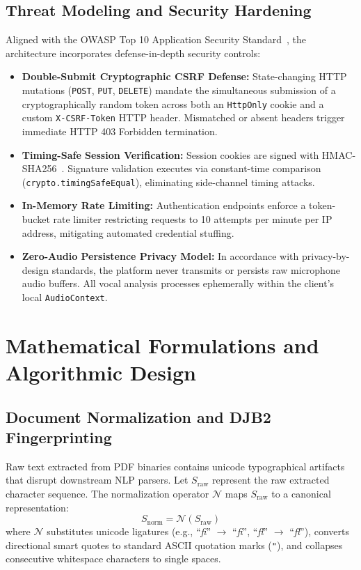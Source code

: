 \documentclass[conference]{IEEEtran}
\begin{document}
\subsection{Threat Modeling and Security Hardening}
Aligned with the OWASP Top 10 Application Security Standard~\cite{owasp2023top10}, the architecture incorporates defense-in-depth security controls:
\begin{itemize}
    \item \textbf{Double-Submit Cryptographic CSRF Defense:} State-changing HTTP mutations (\texttt{POST}, \texttt{PUT}, \texttt{DELETE}) mandate the simultaneous submission of a cryptographically random token across both an \texttt{HttpOnly} cookie and a custom \texttt{X-CSRF-Token} HTTP header. Mismatched or absent headers trigger immediate HTTP 403 Forbidden termination.
    \item \textbf{Timing-Safe Session Verification:} Session cookies are signed with HMAC-SHA256~\cite{nist2015fips1804}. Signature validation executes via constant-time comparison (\texttt{crypto.timingSafeEqual}), eliminating side-channel timing attacks.
    \item \textbf{In-Memory Rate Limiting:} Authentication endpoints enforce a token-bucket rate limiter restricting requests to 10 attempts per minute per IP address, mitigating automated credential stuffing.
    \item \textbf{Zero-Audio Persistence Privacy Model:} In accordance with privacy-by-design standards, the platform never transmits or persists raw microphone audio buffers. All vocal analysis processes ephemerally within the client's local \texttt{AudioContext}.
\end{itemize}

\section{Mathematical Formulations and Algorithmic Design}

\subsection{Document Normalization and DJB2 Fingerprinting}
Raw text extracted from PDF binaries contains unicode typographical artifacts that disrupt downstream NLP parsers. Let $S_{\mathrm{raw}}$ represent the raw extracted character sequence. The normalization operator $\mathcal{N}$ maps $S_{\mathrm{raw}}$ to a canonical representation:
\begin{equation}
    S_{\mathrm{norm}} = \mathcal{N}(S_{\mathrm{raw}})
\end{equation}
where $\mathcal{N}$ substitutes unicode ligatures (e.g., ``\textit{fi}'' $\to$ ``\textit{fi}'', ``\textit{fl}'' $\to$ ``\textit{fl}''), converts directional smart quotes to standard ASCII quotation marks (\texttt{"}), and collapses consecutive whitespace characters to single spaces.
\end{document}
